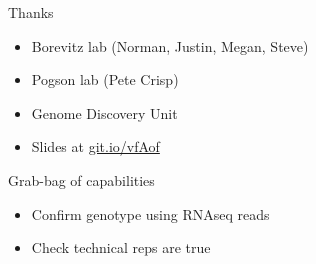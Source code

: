 \documentclass[t]{beamer}
\begin{document}
\begin{frame}{Thanks}
      \begin{itemize}
        \item Borevitz lab (Norman, Justin, Megan, Steve)
        \item Pogson lab (Pete Crisp)
        \item Genome Discovery Unit
        \item Slides at \url{git.io/vfAof}
      \end{itemize}
\end{frame}

\begin{frame}{Grab-bag of capabilities}
  \begin{itemize}
    \item Confirm genotype using RNAseq reads
    \item Check technical reps are true
  \end{itemize}
\end{frame}
\end{document}
